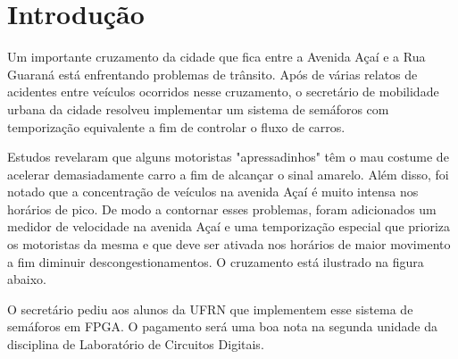 \section{Introdução}
\setlength{\parindent}{2cm}

Um importante cruzamento da cidade que fica entre a Avenida Açaí e a Rua Guaraná está enfrentando problemas de trânsito. Após de várias relatos de acidentes entre veículos ocorridos nesse cruzamento, o secretário de mobilidade urbana da cidade resolveu implementar um sistema de semáforos com temporização equivalente a fim de controlar o fluxo de carros. 

Estudos revelaram que alguns motoristas "apressadinhos" têm o mau costume de acelerar demasiadamente carro a fim de alcançar o sinal amarelo. Além disso, foi notado que a concentração de veículos na avenida Açaí é muito intensa nos horários de pico. De modo a contornar esses problemas, foram adicionados um medidor de velocidade na avenida Açaí e uma temporização especial que prioriza os motoristas da mesma e que deve ser ativada nos horários de maior movimento a fim diminuir descongestionamentos. O cruzamento está ilustrado na figura abaixo.

O secretário pediu aos alunos da UFRN que implementem esse sistema de semáforos em FPGA. O pagamento será uma boa nota na segunda unidade da disciplina de Laboratório de Circuitos Digitais.
